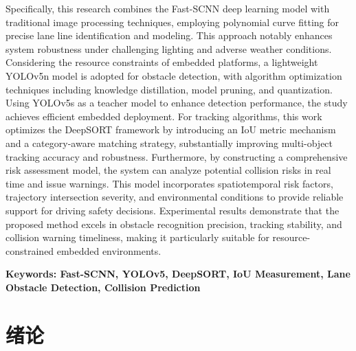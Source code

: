 \documentclass[a4paper, UTF8, fontsize=12pt]{ctexart} %
\numberwithin{equation}{section} %
\begin{document}
Specifically, this research combines the Fast-SCNN deep learning model with traditional image processing techniques, employing polynomial curve fitting for precise lane line identification and modeling. This approach notably enhances system robustness under challenging lighting and adverse weather conditions. Considering the resource constraints of embedded platforms, a lightweight YOLOv5n model is adopted for obstacle detection, with algorithm optimization techniques including knowledge distillation, model pruning, and quantization. Using YOLOv5s as a teacher model to enhance detection performance, the study achieves efficient embedded deployment. For tracking algorithms, this work optimizes the DeepSORT framework by introducing an IoU metric mechanism and a category-aware matching strategy, substantially improving multi-object tracking accuracy and robustness. Furthermore, by constructing a comprehensive risk assessment model, the system can analyze potential collision risks in real time and issue warnings. This model incorporates spatiotemporal risk factors, trajectory intersection severity, and environmental conditions to provide reliable support for driving safety decisions. Experimental results demonstrate that the proposed method excels in obstacle recognition precision, tracking stability, and collision warning timeliness, making it particularly suitable for resource-constrained embedded environments.


\vspace{2em}
\noindent\textbf{Keywords: Fast-SCNN, YOLOv5, DeepSORT, IoU Measurement, Lane Obstacle Detection, Collision Prediction}

\thispagestyle{fancy}

\clearpage
\newpage
\vspace{\baselineskip}
\tableofcontents
\thispagestyle{fancy}
\clearpage


\setcounter{page}{1}
\section{绪论}
\renewcommand{\thefigure}{\thesection-\arabic{figure}}
\renewcommand{\thetable}{\thesection-\arabic{table}}
\renewcommand{\figurename}{图}
\setcounter{figure}{0} %
\setcounter{equation}{0} %
\end{document}
